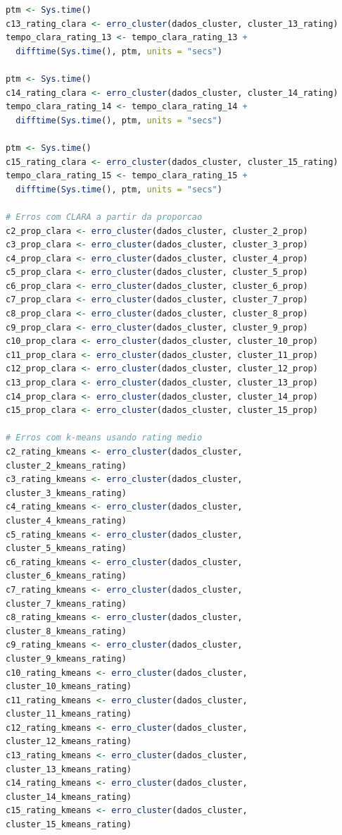 \documentclass[12pt,a4paper,header]{abnt}
\begin{document}
\begin{lstlisting}[language=R]
ptm <- Sys.time()
c13_rating_clara <- erro_cluster(dados_cluster, cluster_13_rating)
tempo_clara_rating_13 <- tempo_clara_rating_13 + 
  difftime(Sys.time(), ptm, units = "secs")  

ptm <- Sys.time()
c14_rating_clara <- erro_cluster(dados_cluster, cluster_14_rating)
tempo_clara_rating_14 <- tempo_clara_rating_14 + 
  difftime(Sys.time(), ptm, units = "secs")
  
ptm <- Sys.time()
c15_rating_clara <- erro_cluster(dados_cluster, cluster_15_rating)
tempo_clara_rating_15 <- tempo_clara_rating_15 + 
  difftime(Sys.time(), ptm, units = "secs")
  
# Erros com CLARA a partir da proporcao
c2_prop_clara <- erro_cluster(dados_cluster, cluster_2_prop)
c3_prop_clara <- erro_cluster(dados_cluster, cluster_3_prop)
c4_prop_clara <- erro_cluster(dados_cluster, cluster_4_prop)
c5_prop_clara <- erro_cluster(dados_cluster, cluster_5_prop)
c6_prop_clara <- erro_cluster(dados_cluster, cluster_6_prop)
c7_prop_clara <- erro_cluster(dados_cluster, cluster_7_prop)
c8_prop_clara <- erro_cluster(dados_cluster, cluster_8_prop)
c9_prop_clara <- erro_cluster(dados_cluster, cluster_9_prop)
c10_prop_clara <- erro_cluster(dados_cluster, cluster_10_prop)
c11_prop_clara <- erro_cluster(dados_cluster, cluster_11_prop)
c12_prop_clara <- erro_cluster(dados_cluster, cluster_12_prop)
c13_prop_clara <- erro_cluster(dados_cluster, cluster_13_prop)
c14_prop_clara <- erro_cluster(dados_cluster, cluster_14_prop)
c15_prop_clara <- erro_cluster(dados_cluster, cluster_15_prop)

# Erros com k-means usando rating medio
c2_rating_kmeans <- erro_cluster(dados_cluster, 
cluster_2_kmeans_rating)
c3_rating_kmeans <- erro_cluster(dados_cluster, 
cluster_3_kmeans_rating)
c4_rating_kmeans <- erro_cluster(dados_cluster, 
cluster_4_kmeans_rating)
c5_rating_kmeans <- erro_cluster(dados_cluster, 
cluster_5_kmeans_rating)
c6_rating_kmeans <- erro_cluster(dados_cluster, 
cluster_6_kmeans_rating)
c7_rating_kmeans <- erro_cluster(dados_cluster, 
cluster_7_kmeans_rating)
c8_rating_kmeans <- erro_cluster(dados_cluster, 
cluster_8_kmeans_rating)
c9_rating_kmeans <- erro_cluster(dados_cluster, 
cluster_9_kmeans_rating)
c10_rating_kmeans <- erro_cluster(dados_cluster, 
cluster_10_kmeans_rating)
c11_rating_kmeans <- erro_cluster(dados_cluster, 
cluster_11_kmeans_rating)
c12_rating_kmeans <- erro_cluster(dados_cluster,
cluster_12_kmeans_rating)
c13_rating_kmeans <- erro_cluster(dados_cluster, 
cluster_13_kmeans_rating)
c14_rating_kmeans <- erro_cluster(dados_cluster, 
cluster_14_kmeans_rating)
c15_rating_kmeans <- erro_cluster(dados_cluster, 
cluster_15_kmeans_rating)


\end{lstlisting}
\end{document}
